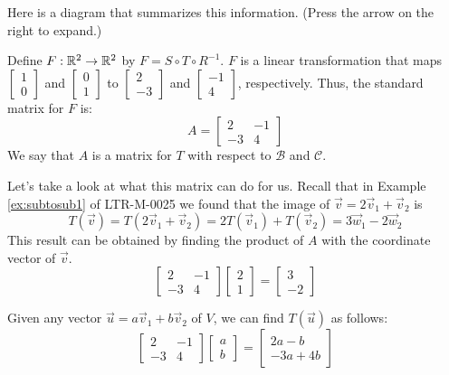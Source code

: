 \documentclass{ximera}
\begin{document}
\begin{exploration}
\begin{expandable}
\begin{center}
\end{center}
\end{expandable}

Here is a diagram that summarizes this information.  (Press the arrow on the right to expand.)

Define $F:\mathbb{R}^2\rightarrow \mathbb{R}^2$ by $F=S\circ T\circ R^{-1}$.  $F$ is a linear transformation that maps $\begin{bmatrix}1\\0\end{bmatrix}$ and $\begin{bmatrix}0\\1\end{bmatrix}$ to $\begin{bmatrix}2\\-3\end{bmatrix}$ and $\begin{bmatrix}-1\\4\end{bmatrix}$, respectively.  Thus, the standard matrix for $F$ is:
$$A=\begin{bmatrix}2&-1\\-3&4\end{bmatrix}$$
We say that $A$ is a matrix for $T$ with respect to $\mathcal{B}$ and $\mathcal{C}$.  

Let's take a look at what this matrix can do for us.  Recall that in Example \ref{ex:subtosub1} of LTR-M-0025 we found that the image of $\vec{v}=2\vec{v}_1+\vec{v}_2$ is $$T(\vec{v})=T(2\vec{v}_1+\vec{v}_2)=2T(\vec{v}_1)+T(\vec{v}_2)=3\vec{w}_1-2\vec{w}_2$$
This result can be obtained by finding the product of $A$ with the coordinate vector of  $\vec{v}$.
$$\begin{bmatrix}2&-1\\-3&4\end{bmatrix}\begin{bmatrix}2\\1\end{bmatrix}=\begin{bmatrix}3\\-2\end{bmatrix}$$

Given any vector $\vec{u}=a\vec{v}_1+b\vec{v}_2$ of $V$, we can find $T(\vec{u})$ as follows:
$$\begin{bmatrix}2&-1\\-3&4\end{bmatrix}\begin{bmatrix}a\\b\end{bmatrix}=\begin{bmatrix}2a-b\\-3a+4b\end{bmatrix}$$


\end{exploration}
\end{document}
